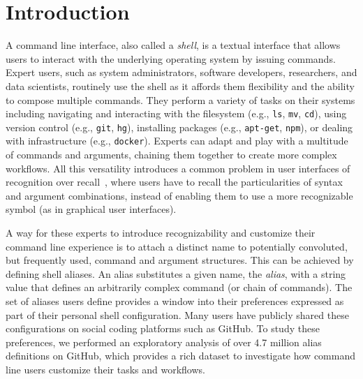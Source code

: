 \section{Introduction}

A command line interface, also called a \emph{shell}, is a textual interface that allows users to interact with the underlying operating system by issuing commands.
Expert users, such as system administrators, software developers, researchers, and data scientists, routinely use the shell as it affords them flexibility and the ability to compose multiple commands.
They perform a variety of tasks on their systems including navigating and interacting with the filesystem (e.g., \verb|ls|, \verb|mv|, \verb|cd|), using version control (e.g., \verb|git|, \verb|hg|), installing packages (e.g., \verb|apt-get|, \verb|npm|), or dealing with infrastructure (e.g., \verb|docker|).
Experts can adapt and play with a multitude of commands and arguments, chaining them together to create more complex workflows.
All this versatility introduces a common problem in user interfaces of recognition over recall~\cite{nielsen:05}, where users have to recall the particularities of syntax and argument combinations, instead of enabling them to use a more recognizable symbol (as in graphical user interfaces).

A way for these experts to introduce recognizability and customize their command line experience is to attach a distinct name to potentially convoluted, but frequently used, command and argument structures.
This can be achieved by defining shell aliases.
An alias substitutes a given name, the \emph{alias}, with a string value that defines an arbitrarily complex command (or chain of commands).
The set of aliases users define provides a window into their preferences expressed as part of their personal shell configuration.
Many users have publicly shared these configurations on social coding platforms such as GitHub.
To study these preferences, we performed an exploratory analysis of over 4.7 million alias definitions on GitHub, which provides a rich dataset to investigate how command line users customize their tasks and workflows.

